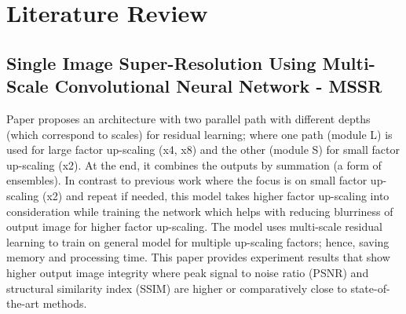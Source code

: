 \documentclass[11pt]{article}
\begin{document}
\section{Literature Review}
\subsection{Single Image Super-Resolution Using Multi-Scale Convolutional Neural Network - MSSR \cite{MSSRwCNN}}

Paper proposes an architecture with two parallel path with different depths (which correspond to scales) for residual learning; where one path (module L) is used for large factor up-scaling (x4, x8) and the other (module S) for small factor up-scaling (x2). At the end, it combines the outputs by summation (a form of ensembles). In contrast to previous work where the focus is on small factor up-scaling (x2) and repeat if needed, this model takes higher factor up-scaling into consideration while training the network which helps with reducing blurriness of output image for higher factor up-scaling. The model uses multi-scale residual learning to train on general model for multiple up-scaling factors; hence, saving memory and processing time. This paper provides experiment results that show higher output image integrity where peak signal to noise ratio (PSNR) and structural similarity index (SSIM) are higher or comparatively close to state-of-the-art methods.
\end{document}
